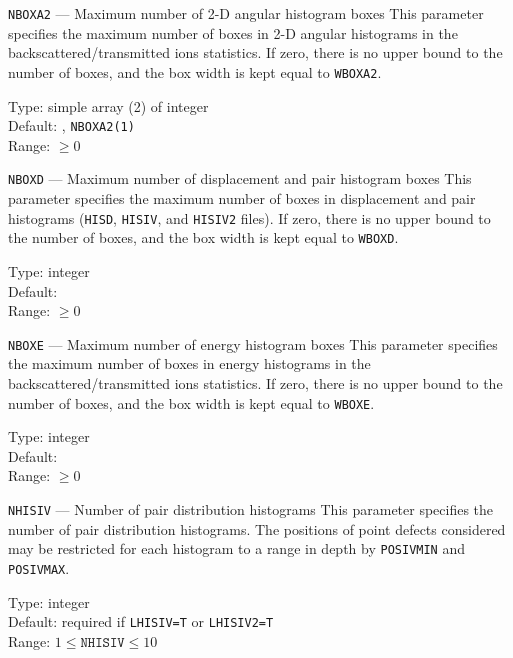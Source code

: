 \begin{keydescription}{\texttt{NBOXA2} --- Maximum number of 2-D angular histogram boxes}
%
  This parameter specifies the maximum number of boxes in 2-D angular histograms
  in the backscattered/transmitted ions statistics.  If
  zero, there is no upper bound to the number of boxes, and the box width is
  kept equal to \texttt{WBOXA2}.
  \begin{keytab}
    Type:    \> simple array (2) of integer \\
    Default: , \texttt{NBOXA2(1)} \\
    Range:   \> $\ge 0$
  \end{keytab}
\end{keydescription}

\begin{keydescription}{\texttt{NBOXD} --- Maximum number of displacement and pair histogram 
    boxes}
%
  This parameter specifies the maximum number of boxes in displacement and pair histograms 
  (\texttt{HISD}, \texttt{HISIV}, and \texttt{HISIV2} files). If zero, there is
  no upper bound to the number of boxes, and the box width is kept equal to
  \texttt{WBOXD}. 
  \begin{keytab}
    Type:    \> integer \\
    Default:  \\
    Range:   \> $\ge 0$
  \end{keytab}
\end{keydescription}

\begin{keydescription}{\texttt{NBOXE} --- Maximum number of energy histogram boxes}
%
  This parameter specifies the maximum number of boxes in energy histograms in the 
  backscattered/transmitted ions statistics. If zero, there is no upper bound to
  the number of boxes, and the box width is kept equal to \texttt{WBOXE}.
  \begin{keytab}
    Type:    \> integer \\
    Default:  \\
    Range:   \> $\ge 0$
  \end{keytab}
\end{keydescription}

\begin{keydescription}{\texttt{NHISIV} --- Number of pair distribution histograms}
%
  This parameter specifies the number of pair distribution histograms. The positions of point 
  defects considered may be restricted for each histogram to a range in depth by 
  \texttt{POSIVMIN} and \texttt{POSIVMAX}.
  \begin{keytab}
    Type:    \> integer \\
    Default: \> required if \texttt{LHISIV=T} or \texttt{LHISIV2=T} \\
    Range:   \> $1 \le \texttt{NHISIV} \le 10$
  \end{keytab}
\end{keydescription}

